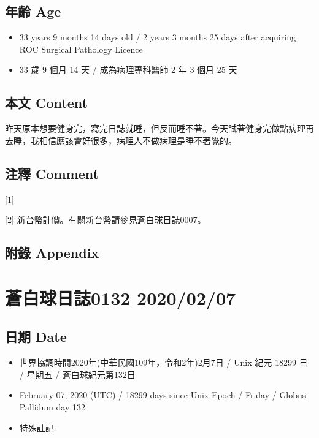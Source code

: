 \documentclass[
]{article}
\providecommand{\tightlist}{%
  \setlength{\itemsep}{0pt}\setlength{\parskip}{0pt}}
\begin{document}
\hypertarget{ux5e74ux9f61-age-5}{%
\subsection{年齡 Age}\label{ux5e74ux9f61-age-5}}

\begin{itemize}
\tightlist
\item
  33 years 9 months 14 days old / 2 years 3 months 25 days after
  acquiring ROC Surgical Pathology Licence
\item
  33 歲 9 個月 14 天 / 成為病理專科醫師 2 年 3 個月 25 天
\end{itemize}

\hypertarget{ux672cux6587-content-5}{%
\subsection{本文 Content}\label{ux672cux6587-content-5}}

昨天原本想要健身完，寫完日誌就睡，但反而睡不著。今天試著健身完做點病理再去睡，我相信應該會好很多，病理人不做病理是睡不著覺的。

\hypertarget{ux6ce8ux91cb-comment-5}{%
\subsection{注釋 Comment}\label{ux6ce8ux91cb-comment-5}}

{[}1{]}

{[}2{]} 新台幣計價。有關新台幣請參見蒼白球日誌0007。

\hypertarget{ux9644ux9304-appendix-5}{%
\subsection{附錄 Appendix}\label{ux9644ux9304-appendix-5}}

\hypertarget{ux84bcux767dux7403ux65e5ux8a8c0132-20200207}{%
\section{蒼白球日誌0132
2020/02/07}\label{ux84bcux767dux7403ux65e5ux8a8c0132-20200207}}

\hypertarget{ux65e5ux671f-date-6}{%
\subsection{日期 Date}\label{ux65e5ux671f-date-6}}

\begin{itemize}
\tightlist
\item
  世界協調時間2020年(中華民國109年，令和2年)2月7日 / Unix 紀元 18299 日
  / 星期五 / 蒼白球紀元第132日
\item
  February 07, 2020 (UTC) / 18299 days since Unix Epoch / Friday /
  Globus Pallidum day 132
\item
  特殊註記:
\end{itemize}
\end{document}
